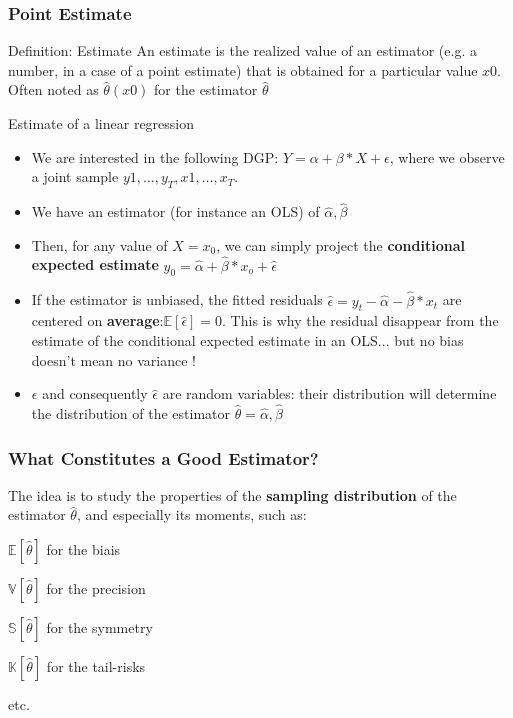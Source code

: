 \documentclass{beamer}
\newenvironment{wideitemize}{\itemize\addtolength{\itemsep}{10pt}}{\enditemize}
\begin{document}
  \begin{frame}
    \frametitle{Point Estimate}
    \begin{block}{Definition: Estimate}
      An estimate is the realized value of an estimator (e.g. a number, in a case of a point estimate) that is obtained for a particular value $x0$. Often noted as $\hat{\theta}(x0)$ for the estimator $\hat{\theta}$
    \end{block}

    \begin{exampleblock}{Estimate of a linear regression}
      \begin{itemize}
      \item We are interested in the following DGP: $Y = \alpha + \beta*X + \epsilon$, where we observe a joint sample ${y1, \dots, y_T}, {x1, \dots, x_T}$.\\
      \item We have an estimator (for instance an OLS) of $\hat{\alpha}, \hat{\beta}$
      \item Then, for any value of $X=x_0$, we can simply project the \textbf{conditional expected estimate} $y_0 = \hat{\alpha} + \hat{\beta}*x_o + \hat{\epsilon}$
      \item If the estimator is unbiased, the fitted residuals $\hat{\epsilon} = y_t - \hat{\alpha} - \hat{\beta}*x_t$ are centered on \textbf{average}:$\mathbb{E}\left[\hat{\epsilon}\right]=0$. This is why the residual disappear from the estimate of the conditional expected estimate in an OLS... but no bias doesn't mean no variance !
      \item $\epsilon$ and consequently $\hat{\epsilon}$ are random variables: their distribution will determine the distribution of the estimator $\hat{\theta} = \hat{\alpha}, \hat{\beta}$
      \end{itemize}
    \end{exampleblock}    
  \end{frame}


  \begin{frame}
    \frametitle{What Constitutes a Good Estimator?}
    The idea is to study the properties of the \textbf{sampling distribution} of the estimator $\hat{\theta}$, and especially its moments, such as:

    \begin{wideitemize}
    \item $\mathbb{E}[\hat{\theta}]$ for the biais
    \item $\mathbb{V}[\hat{\theta}]$ for the precision
    \item $\mathbb{S}[\hat{\theta}]$ for the symmetry
    \item $\mathbb{K}[\hat{\theta}]$ for the tail-risks  
    \item etc.
    \end{wideitemize}
  \end{frame}
\end{document}
